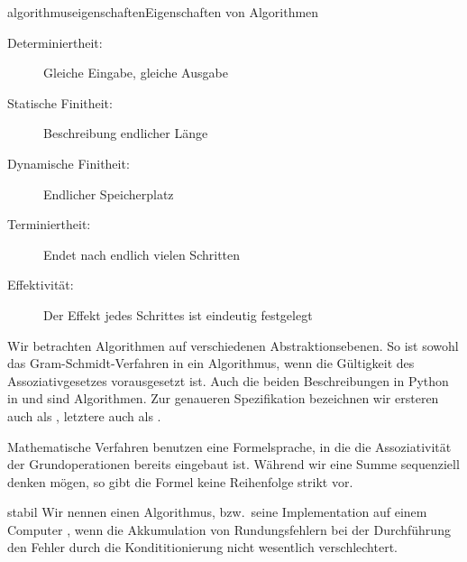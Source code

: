 \begin{Bemerkung*}{algorithmuseigenschaften}{Eigenschaften von Algorithmen}
  \begin{description}
  \item[Determiniertheit:] Gleiche Eingabe, gleiche Ausgabe
  \item[Statische Finitheit:] Beschreibung endlicher Länge
  \item[Dynamische Finitheit:] Endlicher Speicherplatz
  \item[Terminiertheit:] Endet nach endlich vielen Schritten
  \item[Effektivität:] Der Effekt jedes Schrittes ist eindeutig festgelegt
  \end{description}
\end{Bemerkung*}

\begin{remark}
  Wir betrachten Algorithmen auf verschiedenen Abstraktionsebenen. So
  ist sowohl das Gram-Schmidt-Verfahren in
   ein Algorithmus, wenn die
  Gültigkeit des Assoziativgesetzes vorausgesetzt ist. Auch die beiden
  Beschreibungen in Python in  und
   sind Algorithmen. Zur genaueren
  Spezifikation bezeichnen wir ersteren auch als
  , letztere auch als
  .
\end{remark}

\begin{remark}
  Mathematische Verfahren benutzen eine Formelsprache, in die die
  Assoziativität der Grundoperationen bereits eingebaut ist. Während
  wir eine Summe sequenziell denken mögen, so gibt die Formel keine
  Reihenfolge strikt vor.
\end{remark}

\begin{Definition}{stabil}
  Wir nennen einen Algorithmus, bzw.\ seine Implementation auf einem
  Computer , wenn die Akkumulation von Rundungsfehlern
  bei der Durchführung den Fehler durch die Kondititionierung nicht
  wesentlich verschlechtert.
\end{Definition}

